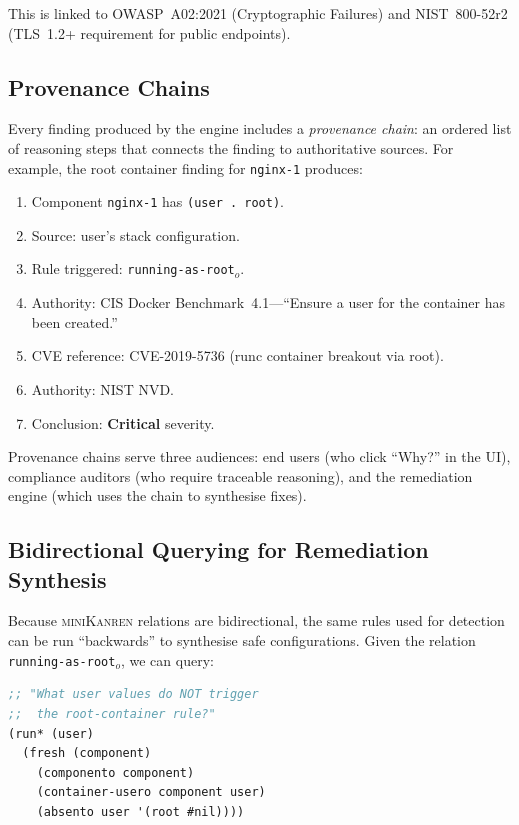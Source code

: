\documentclass[11pt,twocolumn]{article}
\newcommand{\minikanren}{\textsc{miniKanren}\xspace}
\begin{document}
This is linked to OWASP~A02:2021 (Cryptographic Failures) and
NIST~800-52r2 (TLS~1.2+ requirement for public endpoints).

\subsection{Provenance Chains}
\label{sec:engine-provenance}

Every finding produced by the engine includes a \emph{provenance chain}:
an ordered list of reasoning steps that connects the finding to
authoritative sources. For example, the root container finding for
\texttt{nginx-1} produces:

\begin{enumerate}[leftmargin=*,noitemsep]
\item Component \texttt{nginx-1} has \texttt{(user~.~root)}.
\item Source: user's stack configuration.
\item Rule triggered: \texttt{running-as-root$_o$}.
\item Authority: CIS Docker Benchmark~4.1---``Ensure a user for the
      container has been created.''
\item CVE reference: CVE-2019-5736 (runc container breakout via root).
\item Authority: NIST NVD.
\item Conclusion: \textbf{Critical} severity.
\end{enumerate}

Provenance chains serve three audiences: end users (who click ``Why?''
in the UI), compliance auditors (who require traceable reasoning), and
the remediation engine (which uses the chain to synthesise fixes).

\subsection{Bidirectional Querying for Remediation Synthesis}
\label{sec:engine-bidir}

Because \minikanren relations are bidirectional, the same rules used
for detection can be run ``backwards'' to synthesise safe
configurations. Given the relation \texttt{running-as-root$_o$}, we
can query:

\begin{lstlisting}[language=Scheme,caption={Backward query for
remediation synthesis.},label=lst:backward]
;; "What user values do NOT trigger
;;  the root-container rule?"
(run* (user)
  (fresh (component)
    (componento component)
    (container-usero component user)
    (absento user '(root #nil))))
\end{lstlisting}
\end{document}
